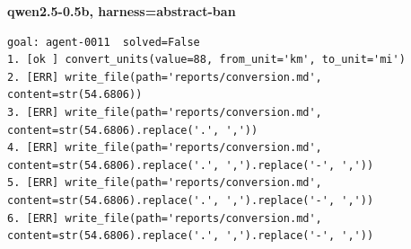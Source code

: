 \textbf{qwen2.5-0.5b, harness=abstract-ban}
{\verbfont\begin{verbatim}
goal: agent-0011  solved=False
1. [ok ] convert_units(value=88, from_unit='km', to_unit='mi')
2. [ERR] write_file(path='reports/conversion.md', content=str(54.6806))
3. [ERR] write_file(path='reports/conversion.md', content=str(54.6806).replace('.', ','))
4. [ERR] write_file(path='reports/conversion.md', content=str(54.6806).replace('.', ',').replace('-', ','))
5. [ERR] write_file(path='reports/conversion.md', content=str(54.6806).replace('.', ',').replace('-', ','))
6. [ERR] write_file(path='reports/conversion.md', content=str(54.6806).replace('.', ',').replace('-', ','))
\end{verbatim}}
